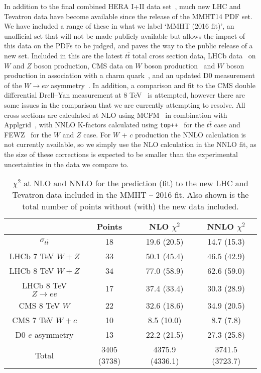 \documentclass{appolb}
\begin{document}
In addition to the final combined HERA I+II data set~\cite{Abramowicz:2015mha}, much new LHC and Tevatron data have become available since the release of the MMHT14 PDF set. We have included a range of these in what we label `MMHT (2016 fit)', an unofficial set that will not be made publicly available but allows the impact of this data on the PDFs to be judged, and paves the way to the public release of a new set. Included in this are the latest $t\overline{t}$ total cross section data, LHCb data~\cite{Aaij:2015gna,Aaij:2015zlq,Aaij:2015vua} on $W$ and $Z$ boson production, CMS data on $W$ boson production~\cite{Khachatryan:2016pev} and $W$ boson production in association with a charm quark~\cite{Chatrchyan:2013uja}, and an updated D0 measurement of the $W\to e\nu$ asymmetry~\cite{D0:2014kma}. In addition, a comparison and fit to the CMS double differential Drell--Yan measurement at 8 TeV~\cite{CMS:2014jea} is attempted, however there are some issues in the comparison that we are currently attempting to resolve. All cross sections are calculated at NLO using MCFM~\cite{Campbell:2015qma} in combination with Applgrid~\cite{Carli:2010rw}, with NNLO K-factors calculated using \texttt{top++}~\cite{Czakon:2011xx} for the $t\overline{t}$ case and FEWZ~\cite{Li:2012wna} for the $W$ and $Z$ case. For $W$ + $c$ production the NNLO calculation is not currently available, so we simply use the NLO calculation in the NNLO fit, as the size of these corrections is expected to be smaller than the experimental uncertainties in the data we compare to.

\begin{table}
\begin{center}
\begin{tabular}{|c|c|c|c|}
\hline
 &Points& NLO $\chi^2$&NNLO $\chi^2$\\ \hline
$\sigma_{t\overline{t}}$ &18&19.6 (20.5)&14.7 (15.3)\\ 
LHCb 7 TeV $W+Z$&33 &50.1 (45.4)&46.5 (42.9)\\
LHCb 8 TeV $W+Z$&34&77.0 (58.9)&62.6 (59.0)\\
LHCb 8 TeV $Z\to ee$ &17&37.4 (33.4)&30.3 (28.9)\\
CMS 8 TeV $W$&22&32.6 (18.6)&34.9 (20.5)\\
CMS 7 TeV $W+c$&10&8.5 (10.0)&8.7 (7.8)\\
D0 $e$ asymmetry&13&22.2 (21.5)&27.3 (25.8)\\
\hline
Total&3405 (3738)&4375.9 (4336.1)&3741.5 (3723.7)\\
\hline
\end{tabular}
\caption{$\chi^2$ at NLO and NNLO for the prediction (fit) to the new LHC and Tevatron data included in the MMHT -- 2016 fit. Also shown is the total number of points without (with) the new data included.}\label{tab:chi}
\end{center}
\end{table}
\end{document}
